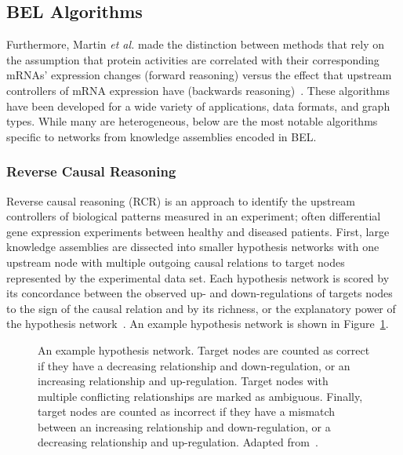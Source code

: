 \subsection{BEL Algorithms}
\label{subsec:bel_algorithms}

Furthermore, Martin \textit{et al.} made the distinction between methods that rely on the assumption that protein activities are correlated with their corresponding mRNAs' expression changes (forward reasoning) versus the effect that upstream controllers of mRNA expression have (backwards reasoning)~\cite{Martin2014}.
These algorithms have been developed for a wide variety of applications, data formats, and graph types.
While many are heterogeneous, below are the most notable algorithms specific to networks from knowledge assemblies encoded in BEL.

\subsubsection{Reverse Causal Reasoning}

Reverse causal reasoning (\ac{RCR}) is an approach to identify the upstream controllers of biological patterns measured in an experiment; often differential gene expression experiments between healthy and diseased patients.
First, large knowledge assemblies are dissected into smaller hypothesis networks with one upstream node with multiple outgoing causal relations to target nodes represented by the experimental data set.
Each hypothesis network is scored by its concordance between the observed up- and down-regulations of targets nodes to the sign of the causal relation and by its richness, or the explanatory power of the hypothesis network~\cite{Catlett2013}.
An example hypothesis network is shown in Figure~\ref{fig:rcr_schematic}.

\begin{figure}
\captionsetup{format=plain}
\caption[A Schematic Diagram of \ac{RCR}]{An example hypothesis network. Target nodes are counted as correct if they have a decreasing relationship and down-regulation, or an increasing relationship and up-regulation. Target nodes with multiple conflicting relationships are marked as ambiguous. Finally, target nodes are counted as incorrect if they have a mismatch between an increasing relationship and down-regulation, or a decreasing relationship and up-regulation. Adapted from~\cite{Catlett2013}.}
\label{fig:rcr_schematic}
\end{figure}

